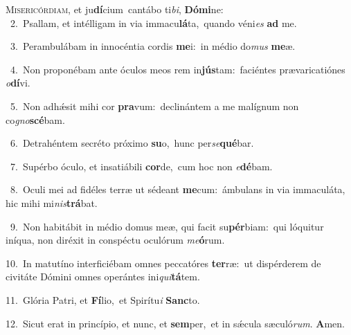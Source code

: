 \lettrine{\initial\textcolor{\initialcolor}{M}}{isericórdiam,} et ju\-\textbf{dí}\-cium~\star cantábo ti\-\textit{bi}\-, \textbf{Dó}\-\textbf{mi}ne:\\
{\numbfont\textcolor{\numbcolor}{~2.}}~Psallam, et intélligam in via immacu\-\textbf{lá}\-ta,~\star quando véni\textit{es} \textbf{ad} me.\par
{\numbfont\textcolor{\numbcolor}{~3.}}~Perambulábam in innocéntia cordis \textbf{me}\-i:~\star in médio do\textit{mus} \textbf{me}\-æ.\par
{\numbfont\textcolor{\numbcolor}{~4.}}~Non proponébam ante óculos meos rem in\-\textbf{jús}\-tam:~\star faciéntes prævaricatiónes \textit{o}\-\textbf{dí}vi.\par
{\numbfont\textcolor{\numbcolor}{~5.}}~Non adhǽsit mihi cor \textbf{pra}\-vum:~\star declinántem a me malígnum non co\-\textit{gno}\-\textbf{scé}bam.\par
{\numbfont\textcolor{\numbcolor}{~6.}}~Detrahéntem secréto próximo \textbf{su}\-o,~\star hunc per\-\textit{se}\-\textbf{qué}bar.\par
{\numbfont\textcolor{\numbcolor}{~7.}}~Supérbo óculo, et insatiábili \textbf{cor}\-de,~\star cum hoc non \textit{e}\-\textbf{dé}bam.\par
{\numbfont\textcolor{\numbcolor}{~8.}}~Oculi mei ad fidéles terræ ut sédeant \textbf{me}\-cum:~\star ámbulans in via immaculáta, hic mihi mi\-\textit{nis}\-\textbf{trá}bat.\par
{\numbfont\textcolor{\numbcolor}{~9.}}~Non habitábit in médio domus meæ, qui facit su\-\textbf{pér}\-biam:~\star qui lóquitur iníqua, non diréxit in conspéctu oculórum \textit{me}\-\textbf{ó}rum.\par
{\numbfont\textcolor{\numbcolor}{10.}}~In matutíno interficiébam omnes peccatóres \textbf{ter}\-ræ:~\star ut dispérderem de civitáte Dómini omnes operántes ini\-\textit{qui}\-\textbf{tá}tem.\par
{\numbfont\textcolor{\numbcolor}{11.}}~Glória Patri, et \textbf{Fí}\-lio,~\star et Spirítu\textit{i} \textbf{Sanc}\-to.\par
{\numbfont\textcolor{\numbcolor}{12.}}~Sicut erat in princípio, et nunc, et \textbf{sem}\-per,~\star et in sǽcula sæculó\-\textit{rum}\-. \textbf{A}\-men.\par
